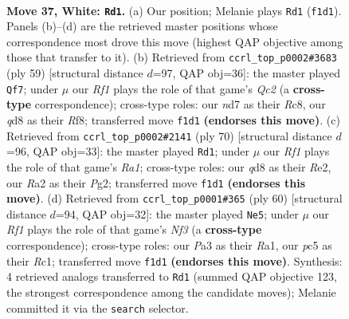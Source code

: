 \documentclass[11pt]{article}
\begin{document}
\clearpage

\begin{figure}[p]\centering
\begin{subfigure}{0.46\textwidth}\centering
\resizebox{\linewidth}{!}{%
\newchessgame
\chessboard[
  setfen={r2q1rk1/3n4/3p4/1Pp1bp1p/p5nP/P4QP1/R1NB4/1N3RK1 w - - 0 37},
  showmover=false,
  pgfstyle=straightmove, color=movearrow, markmove={f1-d1}
]}
\caption{}
\end{subfigure}\hfill
\begin{subfigure}{0.46\textwidth}\centering
\resizebox{\linewidth}{!}{%
\newchessgame
\chessboard[
  setfen={2r2r1k/2q3p1/1b1p3p/1P2pn2/R1P1Q3/5N1P/3B1PP1/4R1K1 b - - 4 30},
  showmover=false,
  pgfstyle=straightmove, color=movearrow, markmove={c7-f7}
]}
\caption{}
\end{subfigure}
\\[4pt]
\begin{subfigure}{0.46\textwidth}\centering
\resizebox{\linewidth}{!}{%
\newchessgame
\chessboard[
  setfen={2r2r2/3nnppk/pq2p2p/2b1P3/P5Q1/5NNP/3BRPP1/R5K1 w - - 1 36},
  showmover=false,
  pgfstyle=straightmove, color=movearrow, markmove={a1-d1}
]}
\caption{}
\end{subfigure}\hfill
\begin{subfigure}{0.46\textwidth}\centering
\resizebox{\linewidth}{!}{%
\newchessgame
\chessboard[
  setfen={r1q3k1/2p2p2/1n4pp/1p1p4/b2Q4/P4NP1/4rPBP/R1R3K1 w - - 2 31},
  showmover=false,
  pgfstyle=straightmove, color=movearrow, markmove={f3-e5}
]}
\caption{}
\end{subfigure}
\caption{\textbf{Move 37, White: \texttt{Rd1}.} (a) Our position; Melanie plays \texttt{Rd1} (\texttt{f1d1}). Panels (b)--(d) are the retrieved master positions whose correspondence most drove this move (highest QAP objective among those that transfer to it). (b) Retrieved from \texttt{ccrl\_top\_p0002\#3683} (ply 59) [structural distance $d$=97, QAP obj=36]: the master played \texttt{Qf7}; under $\mu$ our \emph{Rf1} plays the role of that game's \emph{Qc2} (a \textbf{cross-type} correspondence); cross-type roles: our \emph{n}d7 as their \emph{R}c8, our \emph{q}d8 as their \emph{R}f8; transferred move \texttt{f1d1} \textbf{(endorses this move)}. (c) Retrieved from \texttt{ccrl\_top\_p0002\#2141} (ply 70) [structural distance $d$=96, QAP obj=33]: the master played \texttt{Rd1}; under $\mu$ our \emph{Rf1} plays the role of that game's \emph{Ra1}; cross-type roles: our \emph{q}d8 as their \emph{R}e2, our \emph{R}a2 as their \emph{P}g2; transferred move \texttt{f1d1} \textbf{(endorses this move)}. (d) Retrieved from \texttt{ccrl\_top\_p0001\#365} (ply 60) [structural distance $d$=94, QAP obj=32]: the master played \texttt{Ne5}; under $\mu$ our \emph{Rf1} plays the role of that game's \emph{Nf3} (a \textbf{cross-type} correspondence); cross-type roles: our \emph{P}a3 as their \emph{R}a1, our \emph{p}c5 as their \emph{R}c1; transferred move \texttt{f1d1} \textbf{(endorses this move)}. Synthesis: 4 retrieved analogs transferred to \texttt{Rd1} (summed QAP objective 123, the strongest correspondence among the candidate moves); Melanie committed it via the \texttt{search} selector.}
\label{fig:thought-m72}
\end{figure}
\end{document}
